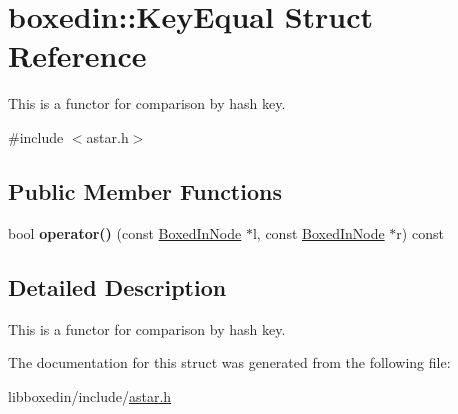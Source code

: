 \hypertarget{structboxedin_1_1KeyEqual}{\section{boxedin\+:\+:Key\+Equal Struct Reference}
\label{structboxedin_1_1KeyEqual}
}


This is a functor for comparison by hash key.  




{\ttfamily \#include $<$astar.\+h$>$}

\subsection*{Public Member Functions}
\begin{DoxyCompactItemize}
\item 
\hypertarget{structboxedin_1_1KeyEqual_a5e3eae9c0cac805982d1adf8498f1116}{bool {\bfseries operator()} (const \hyperlink{classboxedin_1_1BoxedInNode}{Boxed\+In\+Node} $\ast$l, const \hyperlink{classboxedin_1_1BoxedInNode}{Boxed\+In\+Node} $\ast$r) const }\label{structboxedin_1_1KeyEqual_a5e3eae9c0cac805982d1adf8498f1116}

\end{DoxyCompactItemize}


\subsection{Detailed Description}
This is a functor for comparison by hash key. 

The documentation for this struct was generated from the following file\+:\begin{DoxyCompactItemize}
\item 
libboxedin/include/\hyperlink{astar_8h}{astar.\+h}\end{DoxyCompactItemize}
